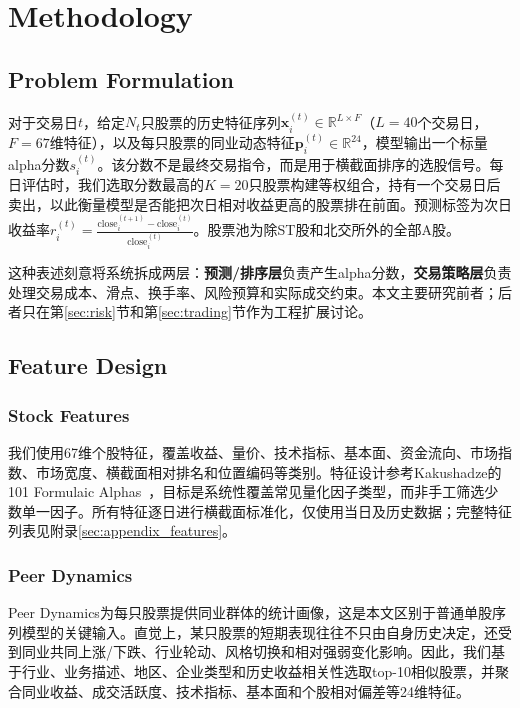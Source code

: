\section{Methodology}
\label{sec:method}

\subsection{Problem Formulation}

对于交易日$t$，给定$N_t$只股票的历史特征序列$\mathbf{x}_i^{(t)} \in \mathbb{R}^{L \times F}$（$L=40$个交易日，$F=67$维特征），以及每只股票的同业动态特征$\mathbf{p}_i^{(t)} \in \mathbb{R}^{24}$，模型输出一个标量alpha分数$s_i^{(t)}$。该分数不是最终交易指令，而是用于横截面排序的选股信号。每日评估时，我们选取分数最高的$K=20$只股票构建等权组合，持有一个交易日后卖出，以此衡量模型是否能把次日相对收益更高的股票排在前面。预测标签为次日收益率$r_i^{(t)} = \frac{\text{close}_{i}^{(t+1)} - \text{close}_{i}^{(t)}}{\text{close}_{i}^{(t)}}$。股票池为除ST股和北交所外的全部A股。

这种表述刻意将系统拆成两层：\textbf{预测/排序层}负责产生alpha分数，\textbf{交易策略层}负责处理交易成本、滑点、换手率、风险预算和实际成交约束。本文主要研究前者；后者只在第\ref{sec:risk}节和第\ref{sec:trading}节作为工程扩展讨论。

\subsection{Feature Design}

\subsubsection{Stock Features}

我们使用67维个股特征，覆盖收益、量价、技术指标、基本面、资金流向、市场指数、市场宽度、横截面相对排名和位置编码等类别。特征设计参考Kakushadze的101 Formulaic Alphas~\cite{kakushadze2016alphas}，目标是系统性覆盖常见量化因子类型，而非手工筛选少数单一因子。所有特征逐日进行横截面标准化，仅使用当日及历史数据；完整特征列表见附录\ref{sec:appendix_features}。

\subsubsection{Peer Dynamics}

Peer Dynamics为每只股票提供同业群体的统计画像，这是本文区别于普通单股序列模型的关键输入。直觉上，某只股票的短期表现往往不只由自身历史决定，还受到同业共同上涨/下跌、行业轮动、风格切换和相对强弱变化影响。因此，我们基于行业、业务描述、地区、企业类型和历史收益相关性选取top-10相似股票，并聚合同业收益、成交活跃度、技术指标、基本面和个股相对偏差等24维特征。

